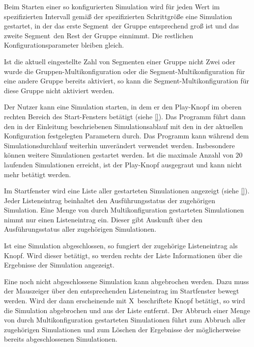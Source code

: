 \documentclass[parskip=full,11pt,twoside]{scrartcl}
\def\segment{Segment}
\def\segments{Segmente}
\begin{document}
Beim Starten einer so konfigurierten Simulation wird für jeden Wert im spezifizierten Intervall gemäß der spezifizierten Schrittgröße eine Simulation gestartet, in der das erste \segment\ der Gruppe entsprechend groß ist und das zweite \segment\ den Rest der Gruppe einnimmt. Die restlichen Konfigurationsparameter bleiben gleich.

Ist die aktuell eingestellte Zahl von \segments n einer Gruppe nicht Zwei oder wurde die Gruppen-Multikonfiguration oder die \segment -Multikonfiguration für eine andere Gruppe bereits aktiviert, so kann die \segment -Multikonfiguration für diese Gruppe nicht aktiviert werden.

Der Nutzer kann eine Simulation starten, in dem er den \glqq Play\grqq -Knopf im oberen rechten Bereich des Start-Fensters betätigt (siehe \cref{}). Das Programm führt dann den in der Einleitung beschriebenen Simulationsablauf mit den in der aktuellen Konfiguration festgelegten Parametern durch. Das Programm kann während dem Simulationsdurchlauf weiterhin unverändert verwendet werden. Insbesondere können weitere Simulationen gestartet werden. Ist die maximale Anzahl von \(20\) laufenden Simulationen erreicht, ist der \glqq Play\grqq -Knopf ausgegraut und kann nicht mehr betätigt werden.

Im Startfenster wird eine Liste aller gestarteten Simulationen angezeigt (siehe \cref{}). Jeder Listeneintrag beinhaltet den Ausführungsstatus der zugehörigen Simulation. Eine Menge von durch Multikonfiguration gestarteten Simulationen nimmt nur einen Listeneintrag ein. Dieser gibt Auskunft über den Ausführungsstatus aller zugehörigen Simulationen.

Ist eine Simulation abgeschlossen, so fungiert der zugehörige Listeneintrag als Knopf. Wird dieser betätigt, so werden rechts der Liste Informationen über die Ergebnisse der Simulation angezeigt.

Eine noch nicht abgeschlossene Simulation kann abgebrochen werden. Dazu muss der Mauszeiger über den entsprechenden Listeneintrag im Startfenster bewegt werden. Wird der dann erscheinende mit \glqq X\grqq\ beschriftete Knopf betätigt, so wird die Simulation abgebrochen und aus der Liste entfernt. Der Abbruch einer Menge von durch Multikonfiguration gestarteten Simulationen führt zum Abbruch aller zugehörigen Simulationen und zum Löschen der Ergebnisse der möglicherweise bereits abgeschlossenen Simulationen.
\end{document}
